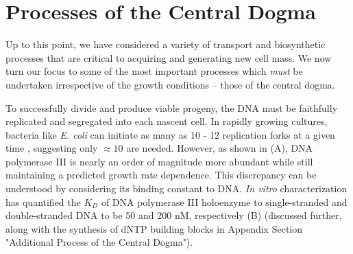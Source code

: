 \section{Processes of the Central Dogma}
Up to this point, we have considered a variety of transport and biosynthetic
processes that are critical to acquiring and generating new cell mass. We now
turn our focus to some of the most important processes which \textit{must} be
undertaken irrespective of the growth conditions -- those of the central dogma.

To successfully divide and produce viable progeny, the DNA must be faithfully
replicated and segregated into each nascent cell. In rapidly growing cultures,
bacteria like \textit{E. coli} can initiate as many as 10 - 12 replication forks
at a given time \citep{bremer2008, si2017}, suggesting  only $\approx 10$ are
needed. However, as shown in (A), DNA polymerase III is
nearly an order of magnitude more abundant while still maintaining a predicted
growth rate dependence. This discrepancy can be understood by considering its
binding constant to DNA. \textit{In vitro} characterization has quantified the
$K_D$ of DNA polymerase III holoenzyme to single-stranded and double-stranded
DNA to be 50 and 200 nM, respectively \citep{ason2000} (B)
(discussed further, along with the synthesis of dNTP building blocks in Appendix
Section "Additional Process of the Central Dogma").

